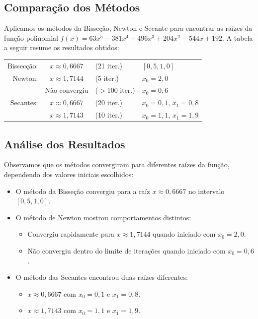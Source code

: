 \documentclass{article}
\begin{document}
\subsection{Compara\c{c}\~{a}o dos M\'{e}todos}
Aplicamos os m\'{e}todos da Bisse\c{c}\~{a}o, Newton e Secante para encontrar as ra\'{i}zes da fun\c{c}\~{a}o polinomial $f(x) = 63x^5 - 381x^4 + 496x^3 + 204x^2 - 544x + 192$. A tabela a seguir resume os resultados obtidos:

\begin{center}
\begin{tabular}{rcll}
Bissecção: & $x \approx 0,6667$ & (21 iter.)     & $[0,5, 1,0]$ \\
Newton:    & $x \approx 1,7144$ & (5 iter.)      & $x_0 = 2,0$ \\
           & Não convergiu      & ($>$100 iter.) & $x_0 = 0,6$ \\
Secantes:  & $x \approx 0,6667$ & (20 iter.)     & $x_0 = 0,1$, $x_1 = 0,8$ \\
           & $x \approx 1,7143$ & (10 iter.)     & $x_0 = 1,1$, $x_1 = 1,9$
\end{tabular}
\end{center}


\subsection{An\'{a}lise dos Resultados}

Observamos que os m\'{e}todos convergiram para diferentes ra\'{i}zes da fun\c{c}\~{a}o, dependendo dos valores iniciais escolhidos:


\begin{itemize}
    \item O m\'{e}todo da Bisse\c{c}\~{a}o convergiu para a ra\'{i}z $x \approx 0,6667$ no intervalo $[0,5, 1,0]$.
    \item O m\'{e}todo de Newton mostrou comportamentos distintos:
    \begin{itemize}
        \item Convergiu rapidamente para $x \approx 1,7144$ quando iniciado com $x_0 = 2,0$.
        \item N\~{a}o convergiu dentro do limite de itera\c{c}\~{o}es quando iniciado com $x_0 = 0,6$.
    \end{itemize}
    \item O m\'{e}todo das Secantes encontrou duas ra\'{i}zes diferentes:
    \begin{itemize}
        \item $x \approx 0,6667$ com $x_0 = 0,1$ e $x_1 = 0,8$.
        \item $x \approx 1,7143$ com $x_0 = 1,1$ e $x_1 = 1,9$.
    \end{itemize}
\end{itemize}
\end{document}
